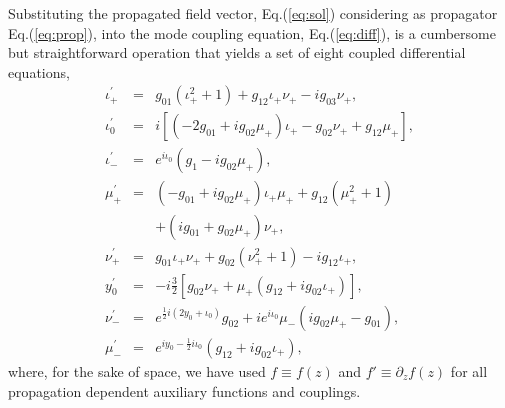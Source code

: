\documentclass[9pt,twocolumn,twoside]{osajnl}
\begin{document}
Substituting the propagated field vector, Eq.(\ref{eq:sol}) considering as propagator Eq.(\ref{eq:prop}), into the mode coupling equation, Eq.(\ref{eq:diff}), is a cumbersome but straightforward operation that yields a set of eight coupled differential equations,
\begin{eqnarray}
	\iota_{+}^{\prime} &=& g_{01} \left( \iota_{+}^2 + 1 \right) + g_{12}  \iota_{+}  \nu_{+} - i  g_{03}   \nu_{+},    \label{eq:iota} \\
	\iota_{0}^{\prime} &=& i \left[ \left(- 2 g_{01} + i g_{02} \mu_{+}  \right) \iota_{+}  - g_{02} \nu_{+} + g_{12} \mu_{+} \right], \\
	\iota_{-}^{\prime} &=& e^{i \iota_0} \left( g_{1} - i g_{02}\mu_{+} \right), \\
	\mu_{+}^{\prime} &=& \left( - g_{01} + i  g_{02} \mu_{+} \right) \iota_{+} \mu_{+}    +  g_{12} \left( \mu_{+}^2 +  1 \right)\nonumber \\
	&&  +  \left( i  g_{01} + g_{02} \mu_{+} \right) \nu_{+},   \\
	\nu_{+}^{\prime} &=& g_{01} \iota_{+} 
	\nu_{+} + g_{02} (  \nu_{+} ^2
	+ 1)-i  g_{12} \iota_{+}, \label{eq:mu} \\
	y_{0}^{\prime} &=& -i\frac{3}{2}  
	[ g_{02}   \nu_{+}+  \mu_{+}  
	( g_{12}+i  g_{02} \iota_{+})],  \\
	\nu_{-}^{\prime} &=& e^{\frac{1}{2}i(2y_0+\iota_0)}
	g_{02} +i e^{i\iota_{0}}  \mu_{-}  (i g_{02} 
	 \mu_{+}-  g_{01}),  \\
	\mu_{-}^{\prime} &=&  e^{i y_0-\frac{1}{2}i \iota_0}
	( g_{12}+i  g_{02} \iota_{+}), 
\end{eqnarray}
where, for the sake of space, we have used $f \equiv f(z)$ and $f' \equiv \partial_{z} f(z)$ for all propagation dependent auxiliary functions and couplings.
\end{document}
